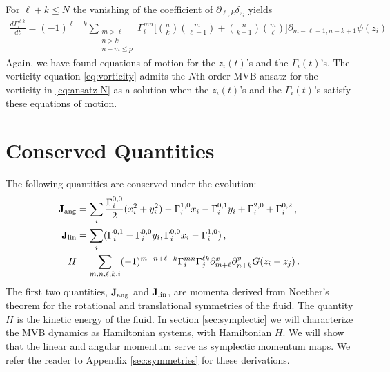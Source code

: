 \documentclass[12pt]{amsart}
\theoremstyle{remark}
\begin{document}
For $\ell+k \leq N$ the vanishing of the coefficient of $\partial_{\ell,k} \delta_{z_i}$ yields
\begin{align*}
 \frac{d\Gamma_i^{\ell k}}{dt} = (-1)^{\ell + k}
  \sum_{
    \substack{
      m > \ell \\
      n > k \\
      n+m \leq p}
    }\Gamma_i^{mn} \Bigg[  \binom{n}{k} \binom{m}{\ell-1} +  \binom{n}{k-1} \binom{m}{\ell} \Bigg] \partial_{m-\ell+1,n-k+1} \psi(z_i) 
\end{align*}
Again, we have found equations of motion for the $z_i(t)$'s and the $\Gamma_i(t)$'s.
The vorticity equation \eqref{eq:vorticity} admits the $N$th order MVB ansatz for the vorticity in \eqref{eq:ansatz N} as a solution when the $z_i(t)$'s and the $\Gamma_i(t)$'s satisfy these equations of motion.

\section{Conserved Quantities}
\label{sec:conserved}
  The following quantities are conserved under the evolution:
  \begin{align*}
	  {\bf J}_{\rm ang} &= \sum_i \frac{\Gamma^{0,0}_i}{2} (x_i^2 + y_i^2) - \Gamma_i^{1,0} x_i - \Gamma_i^{0,1} y_i + \Gamma_i^{2,0} + \Gamma_i^{0,2} \,, \\
	  {\bf J}_{\rm lin} &= \sum_i ( \Gamma_i^{0,1} - \Gamma^{0,0}_i y_i , \Gamma^{0,0}_i x_i -\Gamma^{1,0}_i ) \,, \\
	  H &= \sum_{m,n,\ell,k,i} (-1)^{m+n+\ell +k} \Gamma^{mn}_i \Gamma_j^{\ell k} \partial_{m+\ell}^x \partial_{n+k}^y G(z_i-z_j)\,.
  \end{align*}
  The first two quantities, ${\bf J}_{\rm ang}$ and ${\bf J}_{\rm lin}$, are momenta derived from Noether's theorem for the rotational and translational symmetries of the fluid.
  The quantity $H$ is the kinetic energy of the fluid.
  In section \ref{sec:symplectic} we will characterize the MVB dynamics as Hamiltonian systems, with Hamiltonian $H$.
  We will show that the linear and angular momentum serve as symplectic momentum maps.
  We refer the reader to Appendix \ref{sec:symmetries} for these derivations.
\end{document}
